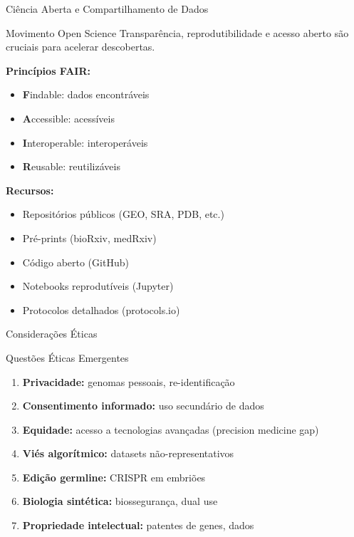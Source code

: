 \begin{frame}{Ciência Aberta e Compartilhamento de Dados}
\begin{block}{Movimento Open Science}
Transparência, reprodutibilidade e acesso aberto são cruciais para acelerar descobertas.
\end{block}

\textbf{Princípios FAIR:}
\begin{itemize}
    \item \textbf{F}indable: dados encontráveis
    \item \textbf{A}ccessible: acessíveis
    \item \textbf{I}nteroperable: interoperáveis
    \item \textbf{R}eusable: reutilizáveis
\end{itemize}

\vspace{0.3cm}

\textbf{Recursos:}
\begin{itemize}
    \item Repositórios públicos (GEO, SRA, PDB, etc.)
    \item Pré-prints (bioRxiv, medRxiv)
    \item Código aberto (GitHub)
    \item Notebooks reprodutíveis (Jupyter)
    \item Protocolos detalhados (protocols.io)
\end{itemize}

\end{frame}

\begin{frame}{Considerações Éticas}
\begin{alertblock}{Questões Éticas Emergentes}
\begin{enumerate}
    \item \textbf{Privacidade:} genomas pessoais, re-identificação
    \item \textbf{Consentimento informado:} uso secundário de dados
    \item \textbf{Equidade:} acesso a tecnologias avançadas (precision medicine gap)
    \item \textbf{Viés algorítmico:} datasets não-representativos
    \item \textbf{Edição germline:} CRISPR em embriões
    \item \textbf{Biologia sintética:} biossegurança, dual use
    \item \textbf{Propriedade intelectual:} patentes de genes, dados
\end{enumerate}
\end{alertblock}

\vspace{0.3cm}

\end{frame}

